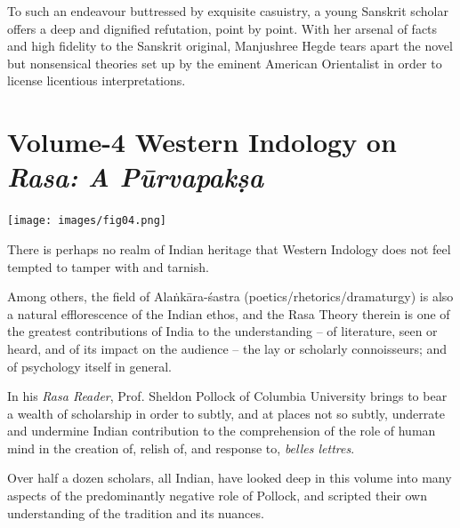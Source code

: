 To such an endeavour buttressed by exquisite casuistry, a young Sanskrit scholar offers a deep and dignified refutation, point by point. With her arsenal of facts and high fidelity to the Sanskrit original, Manjushree Hegde tears apart the novel but nonsensical theories set up by the eminent American Orientalist in order to license licentious interpretations.


\section*{Volume-4 Western Indology on \textit{Rasa: A Pūrvapakṣa}}

\texttt{[image: images/fig04.png]}

There is perhaps no realm of Indian heritage that Western Indology does not feel tempted to tamper with and tarnish.

Among others, the field of Alaṅkāra-śastra (poetics/rhetorics/dramaturgy) is also a natural efflorescence of the Indian ethos, and the Rasa Theory therein is one of the greatest contributions of India to the understanding – of literature, seen or heard, and of its impact on the audience – the lay or scholarly connoisseurs; and of psychology itself in general.

In his \textit{Rasa Reader}, Prof. Sheldon Pollock of Columbia University brings to bear a wealth of scholarship in order to subtly, and at places not so subtly, underrate and undermine Indian contribution to the comprehension of the role of human mind in the creation of, relish of, and response to, \textit{belles lettres}.

Over half a dozen scholars, all Indian, have looked deep in this volume into many aspects of the predominantly negative role of Pollock, and scripted their own understanding of the tradition and its nuances.

